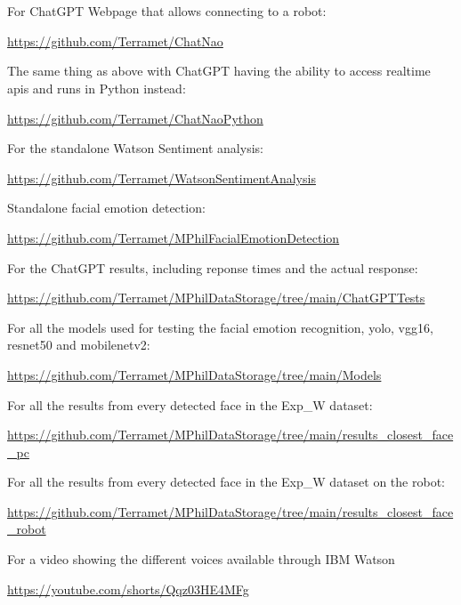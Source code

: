 \chapter{}

\noindent For ChatGPT Webpage that allows connecting to a robot:

\noindent\href{https://github.com/Terramet/ChatNao}{https://github.com/Terramet/ChatNao}

\noindent The same thing as above with ChatGPT having the ability to access realtime apis and runs in Python instead:

\noindent \href{https://github.com/Terramet/ChatNaoPython}{https://github.com/Terramet/ChatNaoPython}

\noindent For the standalone Watson Sentiment analysis:

\noindent \href{https://github.com/Terramet/WatsonSentimentAnalysis}{https://github.com/Terramet/WatsonSentimentAnalysis}

\noindent Standalone facial emotion detection:

\noindent \href{https://github.com/Terramet/MPhilFacialEmotionDetection}{https://github.com/Terramet/MPhilFacialEmotionDetection}

\noindent For the ChatGPT results, including reponse times and the actual response:

\noindent \href{https://github.com/Terramet/MPhilDataStorage/tree/main/ChatGPTTests}{https://github.com/Terramet/MPhilDataStorage/tree/main/ChatGPTTests}

\noindent For all the models used for testing the facial emotion recognition, yolo, vgg16, resnet50 and mobilenetv2:

\noindent \href{https://github.com/Terramet/MPhilDataStorage/tree/main/Models}{https://github.com/Terramet/MPhilDataStorage/tree/main/Models}

\noindent For all the results from every detected face in the Exp\_W dataset:

\noindent \href{https://github.com/Terramet/MPhilDataStorage/tree/main/results_closest_face_pc}{https://github.com/Terramet/MPhilDataStorage/tree/main/results\_closest\_face\_pc}

\noindent For all the results from every detected face in the Exp\_W dataset on the robot:

\noindent \href{https://github.com/Terramet/MPhilDataStorage/tree/main/results_closest_face_robot}{https://github.com/Terramet/MPhilDataStorage/tree/main/results\_closest\_face\_robot}
%

\noindent For a video showing the different voices available through IBM Watson

\noindent \href{https://youtube.com/shorts/Qqz03HE4MFg}{https://youtube.com/shorts/Qqz03HE4MFg}